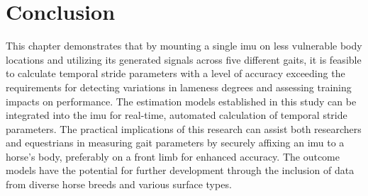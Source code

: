 \section{Conclusion}
\label{sec:conclusion}

This chapter demonstrates that by mounting a single \gls{imu} on less vulnerable body locations and utilizing its generated signals across five different gaits, it is feasible to calculate temporal stride parameters with a level of accuracy exceeding the requirements for detecting variations in lameness degrees and assessing training impacts on performance. The estimation models established in this study can be integrated into the \gls{imu} for real-time, automated calculation of temporal stride parameters. The practical implications of this research can assist both researchers and equestrians in measuring gait parameters by securely affixing an \gls{imu} to a horse's body, preferably on a front limb for enhanced accuracy. The outcome models have the potential for further development through the inclusion of data from diverse horse breeds and various surface types.